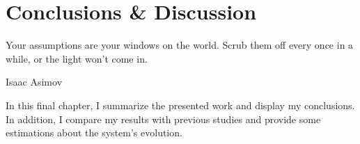 \chapter{Conclusions \& Discussion}\label{discussion}

\epigraph{Your assumptions are your windows on the world. Scrub them off every once in a while, or the light won’t come in.}{Isaac Asimov}

In this final chapter, I summarize the presented work and display my conclusions. In addition, I compare my results with previous studies and provide some estimations about the system's evolution. 













\begin{comment}
    


In this case, the angular momentum vectors of the inner binary and the inflowing gas are (almost) aligned, hence less angular momentum is required to accelerate the gas to the escape velocity. Furthermore, on the current resolution the gas drag is considerably underestimated.

Indeed, when the angular momentum vectors of the inner binary and the inflowing gas are (almost) aligned, less angular momentum needs to be transferred to speed up the gas to the escape velocity.


s.

The work is partially exploratory, as I try to test the efficiency of the method considering different internal structure for the donor star.


I use AMUSE \citep{pelupessy2013astrophysical,portegies2018astrophysical} in order to handle stellar evolution, hydrodynamics and gravity in a self-consistent way.




\section{Discussion}

In this section, I describe some crucial features of the modeling method that will assist the reader in interpreting the graphs, presented in the next sections. 
\end{comment}